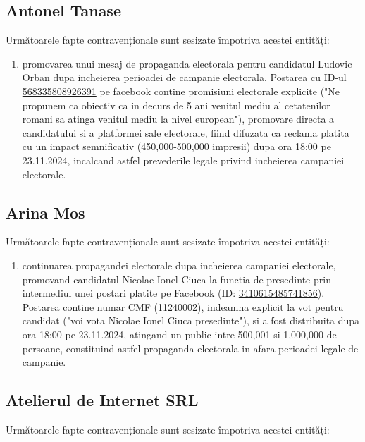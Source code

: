 \documentclass[a4paper,12pt]{article}
\begin{document}
\subsection{Antonel Tanase}
Următoarele fapte contravenționale sunt sesizate împotriva acestei entități:

\begin{enumerate}[leftmargin=*, label=\arabic*.)]
    \item promovarea unui mesaj de propaganda electorala pentru candidatul Ludovic Orban dupa incheierea perioadei de campanie electorala. Postarea cu ID-ul \href{https://www.facebook.com/ads/library/?id=568335808926391}{568335808926391} pe facebook contine promisiuni electorale explicite ("Ne propunem ca obiectiv ca in decurs de 5 ani venitul mediu al cetatenilor romani sa atinga venitul mediu la nivel european"), promovare directa a candidatului si a platformei sale electorale, fiind difuzata ca reclama platita cu un impact semnificativ (450,000-500,000 impresii) dupa ora 18:00 pe 23.11.2024, incalcand astfel prevederile legale privind incheierea campaniei electorale.
\end{enumerate}

\vspace{0.5cm}

\subsection{Arina Mos}
Următoarele fapte contravenționale sunt sesizate împotriva acestei entități:

\begin{enumerate}[leftmargin=*, label=\arabic*.)]
    \item continuarea propagandei electorale dupa incheierea campaniei electorale, promovand candidatul Nicolae-Ionel Ciuca la functia de presedinte prin intermediul unei postari platite pe Facebook (ID: \href{https://www.facebook.com/ads/library/?id=3410615485741856}{3410615485741856}). Postarea contine numar CMF (11240002), indeamna explicit la vot pentru candidat ("voi vota Nicolae Ionel Ciuca presedinte"), si a fost distribuita dupa ora 18:00 pe 23.11.2024, atingand un public intre 500,001 si 1,000,000 de persoane, constituind astfel propaganda electorala in afara perioadei legale de campanie.
\end{enumerate}

\vspace{0.5cm}

\subsection{Atelierul de Internet SRL}
Următoarele fapte contravenționale sunt sesizate împotriva acestei entități:
\end{document}
